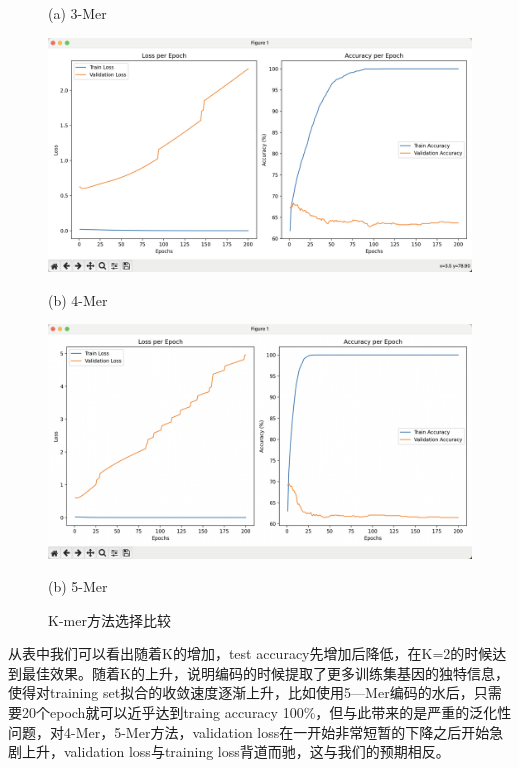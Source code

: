 \documentclass[a4paper,11pt,AutoFakeBold]{ctexart}
\begin{document}
\begin{figure}[h]
\begin{minipage}{0.49\linewidth}
        \caption*{(a) 3-Mer}
    \end{minipage}
    \begin{minipage}{0.49\linewidth}
        \centering
        \includegraphics[height=0.55\linewidth]{Figures/k 4.png}
        \caption*{(b) 4-Mer}
    \end{minipage}
    \begin{minipage}{0.49\linewidth}
        \centering
        \includegraphics[height=0.55\linewidth]{Figures/k 5.png}
        \caption*{(b) 5-Mer}
    \end{minipage}
    \caption{K-mer方法选择比较}
    \label{fig:K-mer方法选择比较}
\end{figure}


从表中我们可以看出随着K的增加，test accuracy先增加后降低，在K=2的时候达到最佳效果。随着K的上升，说明编码的时候提取了更多训练集基因的独特信息，使得对training set拟合的收敛速度逐渐上升，比如使用5—Mer编码的水后，只需要20个epoch就可以近乎达到traing accuracy 100\%，但与此带来的是严重的泛化性问题，对4-Mer，5-Mer方法，validation loss在一开始非常短暂的下降之后开始急剧上升，validation loss与training loss背道而驰，这与我们的预期相反。
\end{document}

